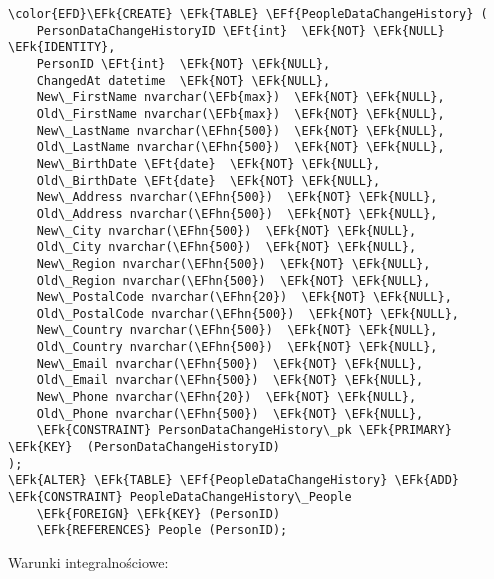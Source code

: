 \documentclass[11pt]{article}
\newcommand{\EFk}[1]{\textcolor{EFk}{\textbf{#1}}} %
\newcommand{\EFb}[1]{\textcolor{EFb}{\textbf{#1}}} %
\newcommand{\EFf}[1]{\textcolor{EFf}{#1}} %
\newcommand{\EFt}[1]{\textcolor{EFt}{\textbf{#1}}} %
\newcommand{\EFhn}[1]{\textcolor{EFhn}{#1}} %
\begin{document}
\begin{Code}
\begin{Verbatim}
\color{EFD}\EFk{CREATE} \EFk{TABLE} \EFf{PeopleDataChangeHistory} (
    PersonDataChangeHistoryID \EFt{int}  \EFk{NOT} \EFk{NULL} \EFk{IDENTITY},
    PersonID \EFt{int}  \EFk{NOT} \EFk{NULL},
    ChangedAt datetime  \EFk{NOT} \EFk{NULL},
    New\_FirstName nvarchar(\EFb{max})  \EFk{NOT} \EFk{NULL},
    Old\_FirstName nvarchar(\EFb{max})  \EFk{NOT} \EFk{NULL},
    New\_LastName nvarchar(\EFhn{500})  \EFk{NOT} \EFk{NULL},
    Old\_LastName nvarchar(\EFhn{500})  \EFk{NOT} \EFk{NULL},
    New\_BirthDate \EFt{date}  \EFk{NOT} \EFk{NULL},
    Old\_BirthDate \EFt{date}  \EFk{NOT} \EFk{NULL},
    New\_Address nvarchar(\EFhn{500})  \EFk{NOT} \EFk{NULL},
    Old\_Address nvarchar(\EFhn{500})  \EFk{NOT} \EFk{NULL},
    New\_City nvarchar(\EFhn{500})  \EFk{NOT} \EFk{NULL},
    Old\_City nvarchar(\EFhn{500})  \EFk{NOT} \EFk{NULL},
    New\_Region nvarchar(\EFhn{500})  \EFk{NOT} \EFk{NULL},
    Old\_Region nvarchar(\EFhn{500})  \EFk{NOT} \EFk{NULL},
    New\_PostalCode nvarchar(\EFhn{20})  \EFk{NOT} \EFk{NULL},
    Old\_PostalCode nvarchar(\EFhn{500})  \EFk{NOT} \EFk{NULL},
    New\_Country nvarchar(\EFhn{500})  \EFk{NOT} \EFk{NULL},
    Old\_Country nvarchar(\EFhn{500})  \EFk{NOT} \EFk{NULL},
    New\_Email nvarchar(\EFhn{500})  \EFk{NOT} \EFk{NULL},
    Old\_Email nvarchar(\EFhn{500})  \EFk{NOT} \EFk{NULL},
    New\_Phone nvarchar(\EFhn{20})  \EFk{NOT} \EFk{NULL},
    Old\_Phone nvarchar(\EFhn{500})  \EFk{NOT} \EFk{NULL},
    \EFk{CONSTRAINT} PersonDataChangeHistory\_pk \EFk{PRIMARY} \EFk{KEY}  (PersonDataChangeHistoryID)
);
\EFk{ALTER} \EFk{TABLE} \EFf{PeopleDataChangeHistory} \EFk{ADD} \EFk{CONSTRAINT} PeopleDataChangeHistory\_People
    \EFk{FOREIGN} \EFk{KEY} (PersonID)
    \EFk{REFERENCES} People (PersonID);
\end{Verbatim}
\end{Code}
Warunki integralnościowe:
\end{document}

